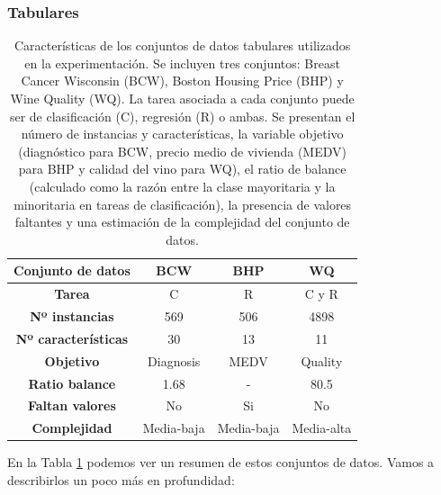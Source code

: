 \subsubsection{Tabulares}

\begin{table}[]
\centering
\begin{tabular}{|c|c|c|c|}
\hline
\textbf{Conjunto de datos}  & \textbf{BCW} & \textbf{BHP} & \textbf{WQ} \\ \hline
\textbf{Tarea}              & C            & R            & C y R       \\ \hline
\textbf{Nº instancias}      & 569          & 506          & 4898        \\ \hline
\textbf{Nº características} & 30           & 13           & 11          \\ \hline
\textbf{Objetivo}           & Diagnosis    & MEDV         & Quality     \\ \hline
\textbf{Ratio balance}      & 1.68         & -            & 80.5        \\ \hline
\textbf{Faltan valores}     & No           & Si           & No          \\ \hline
\textbf{Complejidad}        & Media-baja   & Media-baja   & Media-alta  \\ \hline
\end{tabular}
\caption[Características de los conjuntos de datos tabulares utilizados en la experimentación]{Características de los conjuntos de datos tabulares utilizados en la experimentación. Se incluyen tres conjuntos: Breast Cancer Wisconsin (BCW), Boston Housing Price (BHP) y Wine Quality (WQ). La tarea asociada a cada conjunto puede ser de clasificación (C), regresión (R) o ambas. Se presentan el número de instancias y características, la variable objetivo (diagnóstico para BCW, precio medio de vivienda (MEDV) para BHP y calidad del vino para WQ), el ratio de balance (calculado como la razón entre la clase mayoritaria y la minoritaria en tareas de clasificación), la presencia de valores faltantes y una estimación de la complejidad del conjunto de datos.}
\label{tab:dat_tab}
\end{table}
En la Tabla \ref{tab:dat_tab} podemos ver un resumen de estos conjuntos de datos. Vamos a describirlos un poco más en profundidad:

